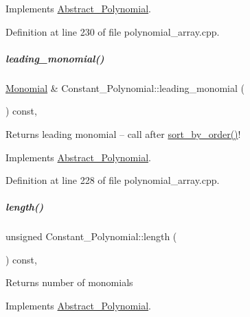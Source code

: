 Implements \hyperlink{group__polygroup_a511ce8e997fe3fd1141293d256e25fad}{Abstract\+\_\+\+Polynomial}.



Definition at line 230 of file polynomial\+\_\+array.\+cpp.

\mbox{\label{group__polygroup_a08a102d5d0f33bc9cc604316e6256788}} 
\subparagraph{\texorpdfstring{leading\+\_\+monomial()}{leading\_monomial()}}
{\footnotesize\ttfamily \hyperlink{group__polygroup_class_monomial}{Monomial} \& Constant\+\_\+\+Polynomial\+::leading\+\_\+monomial (\begin{DoxyParamCaption}{ }\end{DoxyParamCaption}) const\hspace{0.3cm}{\ttfamily [override]}, {\ttfamily [virtual]}}

\begin{DoxyReturn}{Returns}
leading monomial -- call after \hyperlink{group__polygroup_a808018b52eca472a7a1b2995e403f35a}{sort\+\_\+by\+\_\+order()}! 
\end{DoxyReturn}


Implements \hyperlink{group__polygroup_a9186ed0f55c5cc4ecb1b9bc11ba9f679}{Abstract\+\_\+\+Polynomial}.



Definition at line 228 of file polynomial\+\_\+array.\+cpp.

\mbox{\label{group__polygroup_a9a6bcfaf1f4d6260b39f6abfb2b646ea}} 
\subparagraph{\texorpdfstring{length()}{length()}}
{\footnotesize\ttfamily unsigned Constant\+\_\+\+Polynomial\+::length (\begin{DoxyParamCaption}{ }\end{DoxyParamCaption}) const\hspace{0.3cm}{\ttfamily [override]}, {\ttfamily [virtual]}}

\begin{DoxyReturn}{Returns}
number of monomials 
\end{DoxyReturn}


Implements \hyperlink{group__polygroup_a48f4c3c030ca66a9386cd71f71d5def7}{Abstract\+\_\+\+Polynomial}.



